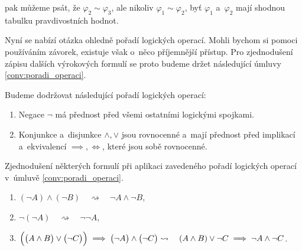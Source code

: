 pak můžeme psát, že $\varphi_2\sim\varphi_3$, ale nikoliv $\varphi_1\sim\varphi_2$, byť $\varphi_1$ a~$\varphi_2$ mají shodnou tabulku pravdivostních hodnot.\par
Nyní se nabízí otázka ohledně pořadí logických operací. Mohli bychom si pomoci používáním závorek, existuje však o~něco příjemnější přístup.  Pro zjednodušení zápisu dalších výrokových formulí se proto budeme držet následující úmluvy \ref{conv:poradi_operaci}.
\begin{convention}\label{conv:poradi_operaci}
    Budeme dodržovat následující pořadí logických operací:
    \begin{enumerate}[label=(\arabic*)]
        \item Negace $\neg$ má přednost před všemi ostatními logickými spojkami.
        \item Konjunkce a~disjunkce $\land,\lor$ jsou rovnocenné a~mají přednost před implikací a~ekvivalencí $\implies,\iff$, které jsou sobě rovnocenné.
    \end{enumerate}
\end{convention}
\begin{example}
    Zjednodušení některých formulí při aplikaci zavedeného pořadí logických operací v~úmluvě \ref{conv:poradi_operaci}.
    \begin{enumerate}[label=(\roman*)]
        \item $(\neg A) \land (\neg B)\quad\rightsquigarrow\quad \neg A \land \neg B$,
        \item $\neg(\neg A)\quad\rightsquigarrow\quad \neg\neg A$,
        \item $\Bigl(\bigl(A \land B\bigr) \lor \bigl(\neg C\bigr)\Bigr) \implies \bigl(\neg A\bigr) \land \bigl(\neg C\bigr)\\ \rightsquigarrow\quad(A \land B) \lor \neg C \implies \neg A \land \neg C$.
    \end{enumerate}
\end{example}

